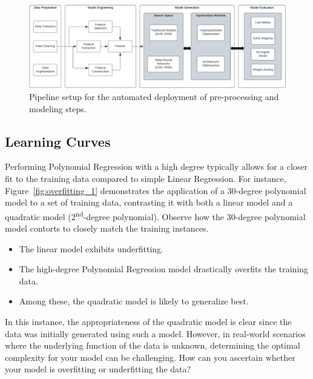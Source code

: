 \documentclass[12pt,letter]{article}
\begin{document}
		\begin{figure}[H]
			\centering
			\includegraphics[width=6.5in]{../figures/AutoML_diagram}
			\caption{Pipeline setup for the automated deployment of pre-processing and modeling steps.\protect\footnotemark[1]}
			\label{fig:AutoML_diagram}
		\end{figure}



\subsection{Learning Curves}

Performing Polynomial Regression with a high degree typically allows for a closer fit to the training data compared to simple Linear Regression. For instance, Figure~\ref{fig:overfitting_1} demonstrates the application of a 30-degree polynomial model to a set of training data, contrasting it with both a linear model and a quadratic model (2\textsuperscript{nd}-degree polynomial). Observe how the 30-degree polynomial model contorts to closely match the training instances.
\begin{itemize}
\item The linear model exhibits underfitting.
\item The high-degree Polynomial Regression model drastically overfits the training data.
\item Among these, the quadratic model is likely to generalize best.
\end{itemize}
In this instance, the appropriateness of the quadratic model is clear since the data was initially generated using such a model. However, in real-world scenarios where the underlying function of the data is unknown, determining the optimal complexity for your model can be challenging. How can you ascertain whether your model is overfitting or underfitting the data?
\end{document}
